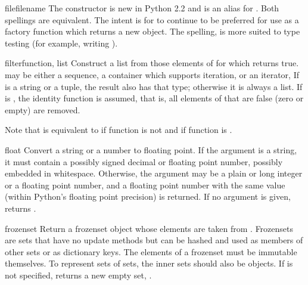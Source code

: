 \begin{funcdesc}{file}{filename}
  The  constructor is new in Python 2.2 and is an
  alias for .  Both spellings are equivalent.  The
  intent is for  to continue to be preferred for use
  as a factory function which returns a new  object.  The
  spelling,  is more suited to type testing (for example,
  writing ).
\end{funcdesc}

\begin{funcdesc}{filter}{function, list}
  Construct a list from those elements of  for which
   returns true.   may be either a sequence, a
  container which supports iteration, or an iterator,  If 
  is a string or a tuple, the result also has that type; otherwise it
  is always a list.  If  is , the identity
  function is assumed, that is, all elements of  that are false
  (zero or empty) are removed.

  Note that  is equivalent to
   if function is
  not  and  if
  function is .
\end{funcdesc}

\begin{funcdesc}{float}{}
  Convert a string or a number to floating point.  If the argument is a
  string, it must contain a possibly signed decimal or floating point
  number, possibly embedded in whitespace. Otherwise, the argument may be a plain
  or long integer or a floating point number, and a floating point
  number with the same value (within Python's floating point
  precision) is returned.  If no argument is given, returns .

\end{funcdesc}

\begin{funcdesc}{frozenset}{}
  Return a frozenset object whose elements are taken from .
  Frozensets are sets that have no update methods but can be hashed and
  used as members of other sets or as dictionary keys.  The elements of
  a frozenset must be immutable themselves.  To represent sets of sets,
  the inner sets should also be  objects.  If
   is not specified, returns a new empty set,
  .
\end{funcdesc}

